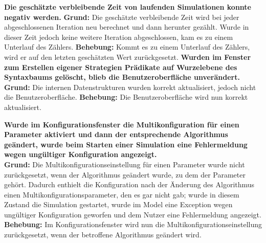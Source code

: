\documentclass[parskip=full,11pt,openany]{scrreprt}
\begin{document}
\textbf{Die geschätzte verbleibende Zeit von laufenden Simulationen konnte negativ werden.} 
\newline
\textbf{Grund: }Die geschätzte verbleibende Zeit wird bei jeder abgeschlossenen Iteration neu berechnet und dann herunter gezählt. Wurde in dieser Zeit jedoch keine weitere Iteration abgeschlossen, kam es zu einem Unterlauf des Zählers. 
\newline
\textbf{Behebung: }Kommt es zu einem Unterlauf des Zählers, wird er auf den letzten geschätzten Wert zurückgesetzt.
\newpage
\textbf{Wurden im Fenster zum Erstellen eigener Strategien Prädikate auf Wurzelebene des Syntaxbaums gelöscht, blieb die Benutzeroberfläche unverändert.} 
\newline
\textbf{Grund: } Die internen Datenstrukturen wurden  korrekt aktualisiert, jedoch nicht die Benutzeroberfläche.
\newline
\textbf{Behebung: } Die Benutzeroberfläche wird nun korrekt aktualisiert.

\textbf{Wurde im Konfigurationsfenster die Multikonfiguration für einen Parameter aktiviert und dann der entsprechende Algorithmus geändert, wurde beim Starten einer Simulation eine Fehlermeldung wegen ungültiger Konfiguration angezeigt.}\\
\textbf{Grund: } Die Multikonfigurationseinstellung für einen Parameter wurde nicht zurückgesetzt, wenn der Algorithmus geändert wurde, zu dem der Parameter gehört. Dadurch enthielt die Konfiguration nach der Änderung des Algorithmus einen Multikonfigurationsparameter, den es gar nicht gab; wurde in diesem Zustand die Simulation gestartet, wurde im Model eine Exception wegen ungültiger Konfiguration geworfen und dem Nutzer eine Fehlermeldung angezeigt.\\
\textbf{Behebung:} Im Konfigurationsfenster wird nun die Multikonfigurationseinstellung zurückgesetzt, wenn der betroffene Algorithmus geändert wird.
\end{document}
